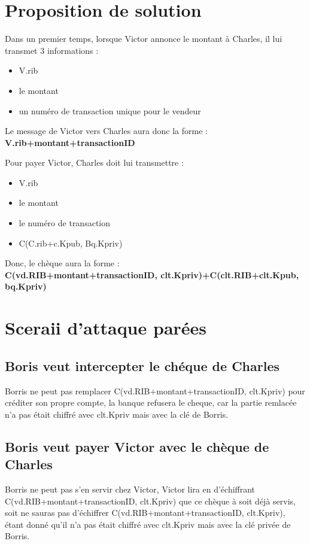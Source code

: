 \documentclass[oneside,10pt]{article}
\begin{document}
\section{Proposition de solution}
Dans un premier temps, lorsque Victor annonce le montant \`a Charles, il lui transmet 3 informations :
\begin{itemize}
\item V.rib
\item le montant
\item un num\'ero de transaction unique pour le vendeur
\end{itemize}
Le message de Victor vers Charles aura donc la forme :\\\textbf{V.rib+montant+transactionID}


Pour payer Victor, Charles doit lui transmettre :
\begin{itemize}
\item V.rib
\item le montant
\item le num\'ero de transaction
\item C(C.rib+c.Kpub, Bq.Kpriv)
\end{itemize}
Donc, le ch\`eque aura la forme : \\\textbf{C(vd.RIB+montant+transactionID, clt.Kpriv)+C(clt.RIB+clt.Kpub, bq.Kpriv)}

\section{Sceraii d'attaque par\'ees}

\subsection{Boris veut intercepter le ch\'eque de Charles}
Borris ne peut pas remplacer C(vd.RIB+montant+transactionID, clt.Kpriv) pour cr\'editer son propre compte, la banque refusera le cheque, car la partie remlac\'ee n'a pas \'etait chiffr\'e avec clt.Kpriv mais avec la cl\'e de Borris.

\subsection{Boris veut payer Victor avec le ch\`eque de Charles}
Borris ne peut pas s'en servir chez Victor, Victor lira en d'\'echiffrant \\C(vd.RIB+montant+transactionID, clt.Kpriv) que ce ch\`eque \`a soit d\'ej\`a servis, soit ne sauras pas d'\'echiffrer C(vd.RIB+montant+transactionID, clt.Kpriv), \'etant donn\'e qu'il n'a pas \'etait chiffr\'e avec clt.Kpriv mais avec la cl\'e priv\'ee de Borris.
\end{document}
